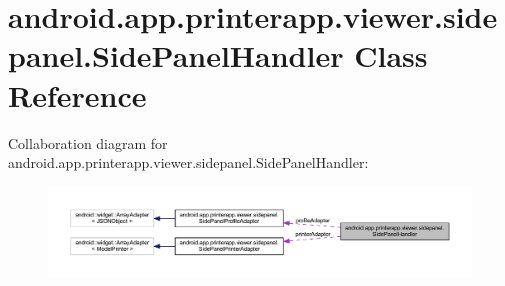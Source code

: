 \hypertarget{classandroid_1_1app_1_1printerapp_1_1viewer_1_1sidepanel_1_1_side_panel_handler}{}\section{android.\+app.\+printerapp.\+viewer.\+sidepanel.\+Side\+Panel\+Handler Class Reference}
\label{classandroid_1_1app_1_1printerapp_1_1viewer_1_1sidepanel_1_1_side_panel_handler}


Collaboration diagram for android.\+app.\+printerapp.\+viewer.\+sidepanel.\+Side\+Panel\+Handler\+:
\nopagebreak
\begin{figure}[H]
\begin{center}
\leavevmode
\includegraphics[width=350pt]{classandroid_1_1app_1_1printerapp_1_1viewer_1_1sidepanel_1_1_side_panel_handler__coll__graph}
\end{center}
\end{figure}
